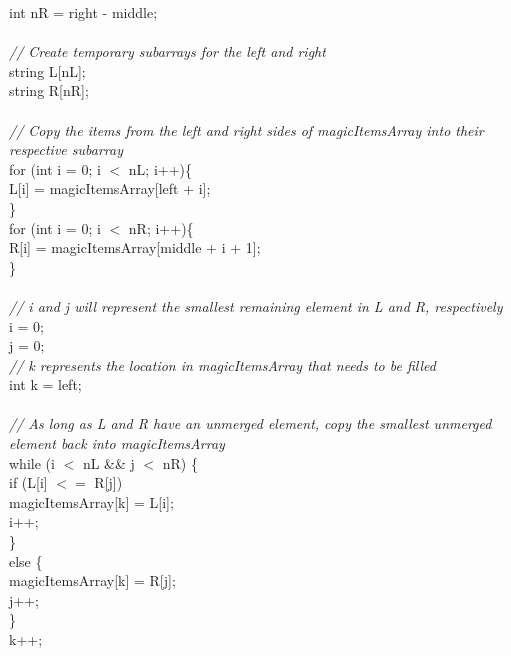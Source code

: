 \documentclass{article}
\begin{document}
\begin {linenumbers}
    \indent int nR = right - middle;\\
\\
   \textit{\indent // Create temporary subarrays for the left and right\\}
    \indent string L[nL];\\
    \indent string R[nR];\\
\\
    \textit{\indent // Copy the items from the left and right sides of magicItemsArray into their respective subarray\\}
    \indent for (int i = 0; i $<$ nL; i++)\{\\
        \indent \indent L[i] = magicItemsArray[left + i];\\
    \indent \}\\
    \indent for (int i = 0; i $<$ nR; i++)\{\\
        \indent \indent R[i] = magicItemsArray[middle + i + 1];\\
    \indent \}\\
\\
    \textit{\indent // i and j will represent the smallest remaining element in L and R, respectively\\}
    \indent i = 0;\\
    \indent j = 0;\\
    \textit{\indent // k represents the location in magicItemsArray that needs to be filled\\}
    \indent int k = left;\\
\\
    \textit{\indent // As long as L and R have an unmerged element, copy the smallest unmerged element back into magicItemsArray\\}
    \indent while (i $<$ nL \&\& j $<$ nR) \{\\
        \indent \indent if (L[i] $<=$ R[j]) {\\
            \indent \indent \indent magicItemsArray[k] = L[i];\\
            \indent \indent \indent i++;\\
        \indent \indent \}\\
        \indent \indent else \{\\
            \indent \indent \indent magicItemsArray[k] = R[j];\\
            \indent \indent \indent j++;\\
        \indent \indent \}\\
        \indent \indent k++;\\
}
\end{linenumbers}
\end{document}
